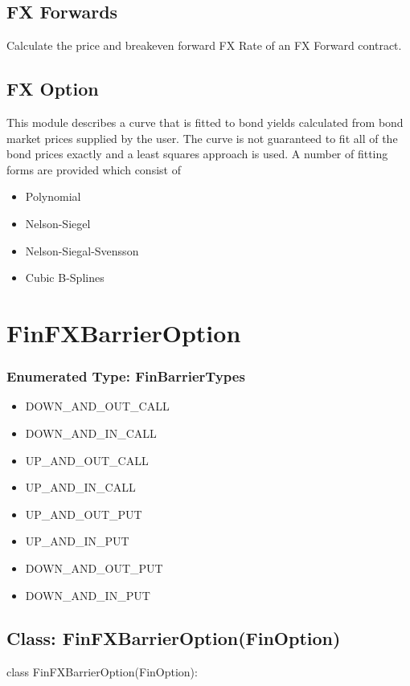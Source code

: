 \documentclass[twoside,11pt]{book}
\begin{document}
\subsection*{FX Forwards}
Calculate the price and breakeven forward FX Rate of an FX Forward contract.


\subsection*{FX Option}
This module describes a curve that is fitted to bond yields calculated from bond market prices supplied by the user. The curve is not guaranteed to fit all of the bond prices exactly and a least squares approach is used. A number of fitting forms are provided which consist of

\begin{itemize}
\item{ Polynomial
}
\item{ Nelson-Siegel
}
\item{ Nelson-Siegal-Svensson
}
\item{ Cubic B-Splines
}
\end{itemize}

\newpage
\section{FinFXBarrierOption}

\subsubsection{Enumerated Type: FinBarrierTypes}
\begin{itemize}
\item{DOWN\_AND\_OUT\_CALL}
\item{DOWN\_AND\_IN\_CALL}
\item{UP\_AND\_OUT\_CALL}
\item{UP\_AND\_IN\_CALL}
\item{UP\_AND\_OUT\_PUT}
\item{UP\_AND\_IN\_PUT}
\item{DOWN\_AND\_OUT\_PUT}
\item{DOWN\_AND\_IN\_PUT}
\end{itemize}

\subsection*{Class: FinFXBarrierOption(FinOption)}
class FinFXBarrierOption(FinOption): 
\end{document}
